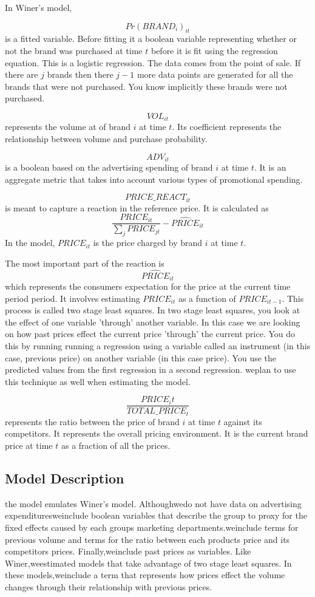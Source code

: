 \documentclass{article}
\begin{document}
In Winer's model,

$${Pr(BRAND_i)}_{it} $$ is a fitted variable. Before fitting it a boolean variable representing whether or not the brand was purchased at time $t$ before it is fit using the regression equation. This is a logistic regression. The data comes from the point of sale. If there are $j$ brands then there $j-1$ more data points are generated for all the brands that were not purchased. You know implicitly these brands were not purchased.

$$VOL_{it}$$ represents the volume at of brand $i$ at time $t$. Its coefficient represents the relationship between volume and purchase probability.

$$ADV_{it}$$ is a boolean based on the advertising spending of brand $i$ at time $t$. It is an aggregate metric that takes into account various types of promotional spending.

$$PRICE\_REACT_{it}$$ is meant to capture a reaction in the reference price. It is calculated as $$\dfrac{PRICE_{it}} {\sum_j PRICE_{jt}} - \widehat{PRICE}_{it}$$ In the model, ${PRICE}_{it}$ is the price charged by brand $i$ at time $t$. 

The most important part of the reaction is $$\widehat{PRICE}_{it}$$ which represents the consumers expectation for the price at the current time period period. It involves estimating ${PRICE}_{it}$ as a function of ${PRICE}_{it-1}$. This process is called two stage least squares. In two stage least squares, you look at the effect of one variable 'through' another variable.  In this case we are looking on how past prices effect the current price 'through' the current price. You do this by running running a regression using a variable called an instrument (in this case, previous price) on another variable (in this case price). You use the predicted values from the first regression in a second regression. weplan to use this technique as well when estimating the model.

$$ \dfrac{PRICE_it}{TOTAL\_PRICE_{t}}$$ represents the ratio between the price of brand $i$ at time $t$ against its competitors. It represents the overall pricing environment. It is the current brand price at time $t$ as a fraction of all the prices.


\subsection{Model Description}

the model emulates Winer's model. Althoughwedo not have data on advertising expendituresweinclude boolean variables that describe the group to proxy for the fixed effects caused by each groups marketing departments.weinclude terms for previous volume and terms for the ratio between each products price and its competitors prices. Finally,weinclude past prices as variables. Like Winer,weestimated models that take advantage of two stage least squares. In these models,weinclude a term that represents how prices effect the volume changes through their relationship with previous prices. 
\end{document}
